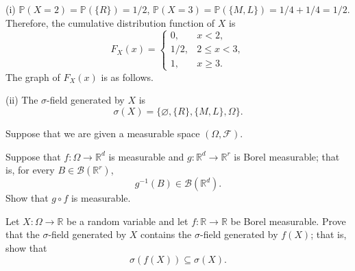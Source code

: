 \documentclass[11pt]{article}
\begin{document}
\begin{solution}
  
  (i) $\mathbb{P}(X = 2) = \mathbb{P}(\{R\}) = 1/2$, $\mathbb{P}(X = 3) = \mathbb{P}(\{M,L\}) = 1/4 + 1/4 = 1/2$. Therefore, the cumulative distribution function of $X$ is
  \[
    F_X(x) = \begin{cases}
      0, & x < 2,\\
      1/2, & 2 \leq x < 3,\\
      1, & x \geq 3.
    \end{cases}
  \]
  The graph of $F_X(x)$ is as follows.

    \begin{center}
    \end{center}

  (ii) The $\sigma$-field generated by $X$ is
  \[
    \sigma(X) = \{\varnothing, \{R\}, \{M,L\}, \Omega\}.
  \]

  \end{solution}


  \begin{problem}[20]

Suppose that we are given a measurable space $(\Omega,\mathcal{F})$.

\begin{subproblems}
  \item {} Suppose that $f:\Omega\to\mathbb{R}^d$ is measurable and
  $g:\mathbb{R}^d\to\mathbb{R}^r$ is Borel measurable; that is, for every
  $B\in\mathcal{B}(\mathbb{R}^r)$,
  \[
    g^{-1}(B)\in\mathcal{B}(\mathbb{R}^d).
  \]
  Show that $g\circ f$ is measurable.

  \item {} Let $X:\Omega\to\mathbb{R}$ be a random variable and let
  $f:\mathbb{R}\to\mathbb{R}$ be Borel measurable. Prove that the $\sigma$-field generated by
  $X$ contains the $\sigma$-field generated by $f(X)$; that is, show that
  \[
    \sigma(f(X))\subseteq\sigma(X).
  \]
\end{subproblems}
\end{problem}
\end{document}
